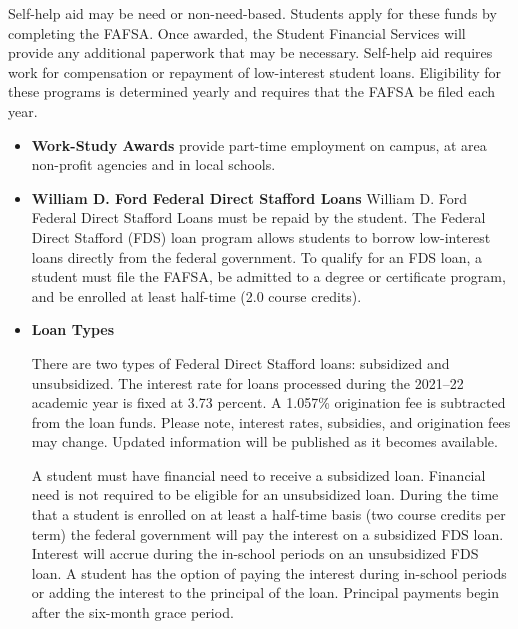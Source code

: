 \documentclass[
  letterpaper,
]{scrbook}
\begin{document}
Self-help aid may be need or non-need-based. Students apply for these
funds by completing the FAFSA. Once awarded, the Student Financial
Services will provide any additional paperwork that may be necessary.
Self-help aid requires work for compensation or repayment of
low-interest student loans. Eligibility for these programs is determined
yearly and requires that the FAFSA be filed each year.

\begin{itemize}
\item
  \textbf{Work-Study Awards} provide part-time employment on campus, at
  area non-profit agencies and in local schools.
\item
  \textbf{William D. Ford Federal Direct Stafford Loans} William D. Ford
  Federal Direct Stafford Loans must be repaid by the student. The
  Federal Direct Stafford (FDS) loan program allows students to borrow
  low-interest loans directly from the federal government. To qualify
  for an FDS loan, a student must file the FAFSA, be admitted to a
  degree or certificate program, and be enrolled at least half-time (2.0
  course credits).
\item
  \textbf{Loan Types}

  There are two types of Federal Direct Stafford loans: subsidized and
  unsubsidized. The interest rate for loans processed during the
  2021--22 academic year is fixed at 3.73 percent. A 1.057\% origination
  fee is subtracted from the loan funds. Please note, interest rates,
  subsidies, and origination fees may change. Updated information will
  be published as it becomes available.

  A student must have financial need to receive a subsidized loan.
  Financial need is not required to be eligible for an unsubsidized
  loan. During the time that a student is enrolled on at least a
  half-time basis (two course credits per term) the federal government
  will pay the interest on a subsidized FDS loan. Interest will accrue
  during the in-school periods on an unsubsidized FDS loan. A student
  has the option of paying the interest during in-school periods or
  adding the interest to the principal of the loan. Principal payments
  begin after the six-month grace period.


\end{itemize}
\end{document}
